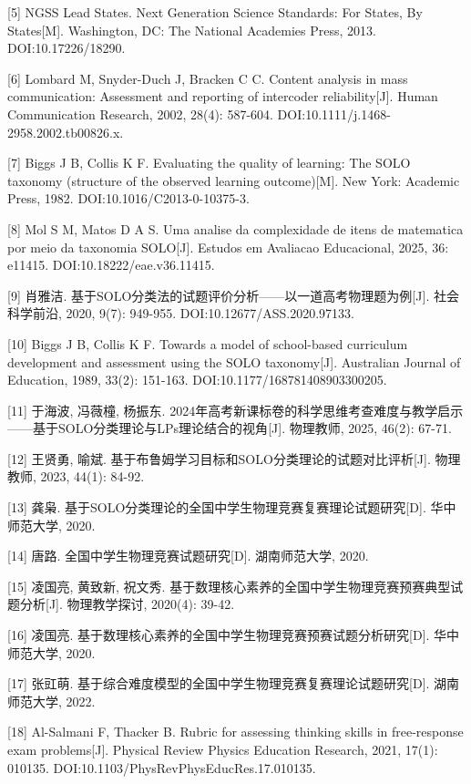\documentclass[
  12pt,
  a4paper]{ctexbook}
\begin{document}
{[}5{]} NGSS Lead States. Next Generation Science Standards: For States,
By States{[}M{]}. Washington, DC: The National Academies Press, 2013.
DOI:10.17226/18290.

{[}6{]} Lombard M, Snyder-Duch J, Bracken C C. Content analysis in mass
communication: Assessment and reporting of intercoder
reliability{[}J{]}. Human Communication Research, 2002, 28(4): 587-604.
DOI:10.1111/j.1468-2958.2002.tb00826.x.

{[}7{]} Biggs J B, Collis K F. Evaluating the quality of learning: The
SOLO taxonomy (structure of the observed learning outcome){[}M{]}. New
York: Academic Press, 1982. DOI:10.1016/C2013-0-10375-3.

{[}8{]} Mol S M, Matos D A S. Uma analise da complexidade de itens de
matematica por meio da taxonomia SOLO{[}J{]}. Estudos em Avaliacao
Educacional, 2025, 36: e11415. DOI:10.18222/eae.v36.11415.

{[}9{]} 肖雅洁.
基于SOLO分类法的试题评价分析------以一道高考物理题为例{[}J{]}.
社会科学前沿, 2020, 9(7): 949-955. DOI:10.12677/ASS.2020.97133.

{[}10{]} Biggs J B, Collis K F. Towards a model of school-based
curriculum development and assessment using the SOLO taxonomy{[}J{]}.
Australian Journal of Education, 1989, 33(2): 151-163.
DOI:10.1177/168781408903300205.

{[}11{]} 于海波, 冯薇橦, 杨振东.
2024年高考新课标卷的科学思维考查难度与教学启示------基于SOLO分类理论与LPs理论结合的视角{[}J{]}.
物理教师, 2025, 46(2): 67-71.

{[}12{]} 王贤勇, 喻斌.
基于布鲁姆学习目标和SOLO分类理论的试题对比评析{[}J{]}. 物理教师, 2023,
44(1): 84-92.

{[}13{]} 龚枭.
基于SOLO分类理论的全国中学生物理竞赛复赛理论试题研究{[}D{]}.
华中师范大学, 2020.

{[}14{]} 唐路. 全国中学生物理竞赛试题研究{[}D{]}. 湖南师范大学, 2020.

{[}15{]} 凌国亮, 黄致新, 祝文秀.
基于数理核心素养的全国中学生物理竞赛预赛典型试题分析{[}J{]}.
物理教学探讨, 2020(4): 39-42.

{[}16{]} 凌国亮.
基于数理核心素养的全国中学生物理竞赛预赛试题分析研究{[}D{]}.
华中师范大学, 2020.

{[}17{]} 张豇萌.
基于综合难度模型的全国中学生物理竞赛复赛理论试题研究{[}D{]}.
湖南师范大学, 2022.

{[}18{]} Al-Salmani F, Thacker B. Rubric for assessing thinking skills
in free-response exam problems{[}J{]}. Physical Review Physics Education
Research, 2021, 17(1): 010135. DOI:10.1103/PhysRevPhysEducRes.17.010135.
\end{document}
